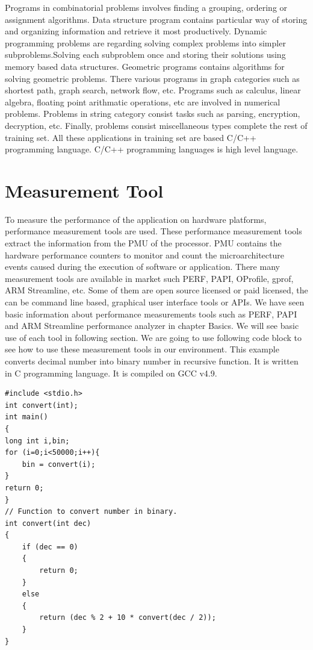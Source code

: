\par Programs in combinatorial problems involves finding a grouping, ordering or assignment algorithms. Data structure program contains particular way of storing and organizing information and retrieve it most productively. Dynamic programming problems are regarding solving complex problems into simpler subproblems.Solving each subproblem once and storing their solutions using memory based data structures. Geometric programs contains algorithms for solving geometric problems. There various programs in graph categories such as shortest path, graph search, network flow, etc. Programs such as calculus, linear algebra, floating point arithmatic operations, etc are involved in numerical problems. Problems in string category consist tasks such as parsing, encryption, decryption, etc. Finally, problems consist miscellaneous types complete the rest of training set. All these applications in training set are based C/C++ programming language. C/C++ programming languages is high level language. 

\section{Measurement Tool}

To measure the performance of the application on hardware platforms, performance measurement tools are used. These performance measurement tools extract the information from the PMU of the processor. PMU contains the hardware performance counters to monitor and count the microarchitecture events caused during the execution of software or application. There many measurement tools are available in market such PERF, PAPI, OProfile, gprof, ARM Streamline, etc. Some of them are open source licensed or paid licensed, the can be command line based, graphical user interface tools or APIs. We have seen basic information about performance measurements tools such as PERF, PAPI and ARM Streamline performance analyzer in chapter Basics. We will see basic use of each tool in following section. We are going to use following code block to see how to use these measurement tools in our environment. This example converts decimal number into binary number in recursive function. It is written in C programming language. It is compiled on GCC v4.9. 

\begin{lstlisting}
#include <stdio.h>
int convert(int);
int main()
{
long int i,bin;
for (i=0;i<50000;i++){
    bin = convert(i);
}
return 0;
}
// Function to convert number in binary.
int convert(int dec)
{
    if (dec == 0)
    {
        return 0;
    }
    else
    {
        return (dec % 2 + 10 * convert(dec / 2));
    }
}
\end{lstlisting}

